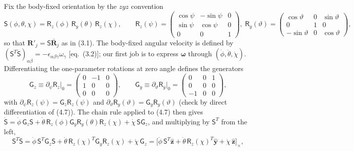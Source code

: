 Fix the body-fixed orientation by the $zyz$ convention
\begin{equation}
\mathsf S(\phi,\theta,\chi)=\mathsf R_z(\phi)\,\mathsf R_y(\theta)\,\mathsf R_z(\chi),\qquad
\mathsf R_z(\psi)=\!\begin{pmatrix}\cos\psi&-\sin\psi&0\\ \sin\psi&\cos\psi&0\\ 0&0&1\end{pmatrix},\;
\mathsf R_y(\vartheta)=\!\begin{pmatrix}\cos\vartheta&0&\sin\vartheta\\ 0&1&0\\ -\sin\vartheta&0&\cos\vartheta\end{pmatrix}, \tag{4.7}
\end{equation}
so that $\mathbf R'_j=\mathsf S\bar{\mathbf R}_j$ as in (3.1). The body-fixed angular velocity is defined by $(\mathsf S^{T}\dot{\mathsf S})_{\alpha\beta}=-\epsilon_{\alpha\beta\gamma}\omega_\gamma$ [eq.~(3.2)]; our first job is to express $\boldsymbol\omega$ through $(\dot\phi,\dot\theta,\dot\chi)$. Differentiating the one-parameter rotations at zero angle defines the generators
\begin{equation}
\mathsf G_z\equiv\partial_\psi \mathsf R_z\big|_{0}=\begin{pmatrix}0&-1&0\\1&0&0\\0&0&0\end{pmatrix},\qquad
\mathsf G_y\equiv\partial_\vartheta \mathsf R_y\big|_{0}=\begin{pmatrix}0&0&1\\0&0&0\\-1&0&0\end{pmatrix}, \tag{4.8}
\end{equation}
with $\partial_\psi \mathsf R_z(\psi)=\mathsf G_z\mathsf R_z(\psi)$ and $\partial_\vartheta \mathsf R_y(\vartheta)=\mathsf G_y\mathsf R_y(\vartheta)$ (check by direct differentiation of (4.7)). The chain rule applied to (4.7) then gives $\dot{\mathsf S}=\dot\phi\,\mathsf G_z\mathsf S+\dot\theta\,\mathsf R_z(\phi)\mathsf G_y\mathsf R_y(\theta)\mathsf R_z(\chi)+\dot\chi\,\mathsf S \mathsf G_z$, and multiplying by $\mathsf S^{T}$ from the left,
\begin{equation}
\mathsf S^{T}\dot{\mathsf S}
=\dot\phi\,\mathsf S^{T}\mathsf G_z\mathsf S
+\dot\theta\,\mathsf R_z(\chi)^{T}\mathsf G_y\mathsf R_z(\chi)
+\dot\chi\,\mathsf G_z
=\bigl[\dot\phi\,\mathsf S^{T}\hat{\mathbf z}+\dot\theta\,\mathsf R_z(\chi)^{T}\hat{\mathbf y}+\dot\chi\,\hat{\mathbf z}\bigr]_\times , \tag{4.9}
\end{equation}
